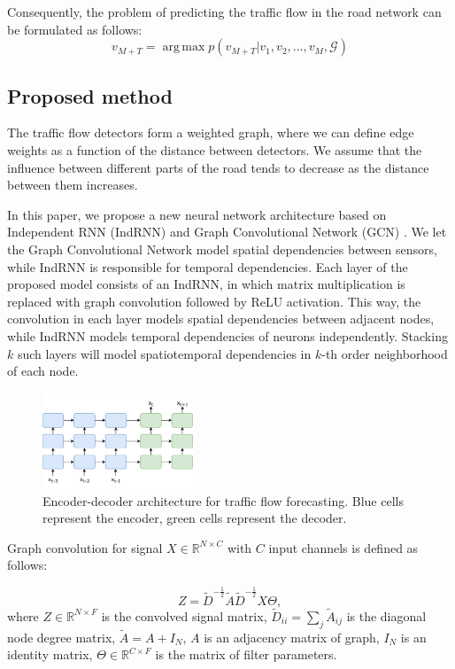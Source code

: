 \documentclass[letterpaper, 10 pt, conference]{ieeeconf}  %
\DeclareMathOperator*{\argmax}{arg\,max}
\begin{document}
Consequently, the problem of predicting the traffic flow in the road network can be formulated as follows:
\begin{equation}
v_{M + T} = \argmax{ p (v_{M + T}| v_1, v_2, ..., v_M, \mathcal{G})}
\end{equation}


\subsection{Proposed method}
The traffic flow detectors form a weighted graph, where we can define edge weights as a function of the distance between detectors. We assume that the influence between different parts of the road tends to decrease as the distance between them increases.

In this paper, we propose a new neural network architecture based on Independent RNN (IndRNN) \cite{Li2018} and Graph Convolutional Network (GCN) \cite{kipf2017semi}. We let the Graph Convolutional Network model spatial dependencies between sensors, while IndRNN is responsible for temporal dependencies. Each layer of the proposed model consists of an IndRNN, in which matrix multiplication is replaced with graph convolution followed by ReLU activation. This way, the convolution in each layer models spatial dependencies between adjacent nodes, while IndRNN models temporal dependencies of neurons independently. Stacking $k$ such layers will model spatiotemporal dependencies in $k$-th order neighborhood of each node.

\begin{figure}
    \centering
    \includegraphics[width=0.4\textwidth]{encoder2.png}
    \caption{Encoder-decoder architecture for traffic flow forecasting. Blue cells represent the encoder, green cells represent the decoder.}
    \label{fig:encdec}
\end{figure}
Graph convolution for signal $ X \in \mathbb{R}^{N \times C} $ with $ C $ input channels is defined \cite{kipf2017semi} as follows:

\begin{equation}
Z = \widetilde{D}^{-\frac{1}{2}}\widetilde{A}\widetilde{D}^{-\frac{1}{2}}X\Theta,
\end{equation}
where  $Z \in \mathbb{R}^{N \times F}$ is the convolved signal matrix, $ \widetilde{D}_{ii}=\sum_j \widetilde{A}_{ij} $ is the diagonal node degree matrix, $ \widetilde{A} = A + I_N $, $ A $ is an adjacency matrix of graph, $I_N$ is an identity matrix, $ \Theta \in \mathbb{R}^{C \times F}$ is the matrix of filter parameters.
\end{document}
